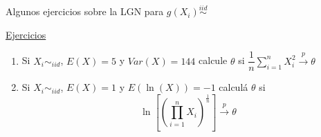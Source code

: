\documentclass{beamer}
\theoremstyle{definition}
\begin{document}
\begin{frame}{\color{rosee}Algunos ejercicios sobre la LGN para $g(X_i)\stackrel{iid}{\sim}$}\small
    
    
    \underline{Ejercicios}
    
    \begin{enumerate}
       \item \noindent Si $X_i\sim_{iid}$, $E(X)=5$ y $Var(X)=144$ calcule $\theta$ si $\dfrac{1}{n}\displaystyle\sum_{i=1}^{n} X_i^2 \overset{p}{\to} \theta$
        
        
        \item \noindent Si $X_i\sim_{iid}$, $E(X)=1$ y $E(\ln(X))=-1$ calculá $\theta$ si \[\ln\left[\left(\displaystyle\prod_{i=1}^{n} X_i\right)^{\frac{1}{n}}\right] \overset{p}{\to} \theta\]
        
        
        \end{enumerate}
    
\end{frame}

\end{document}
